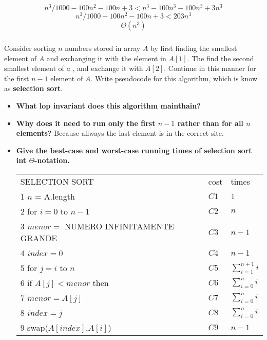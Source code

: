 \documentclass[a4paper,12pt]{article}
\begin{document}
  $$n^3/1000 - 100n^2 - 100n + 3 < n^3 - 100n^3 - 100n^3 + 3n^3$$
  $$n^3/1000 - 100n^2 - 100n + 3 < 203n^3$$
  $$\Theta(n^3)$$
  
    \subsubsection{} Consider sorting $n$ numbers stored in array $A$
    by first finding the smallest element of $A$ and exchanging it with
    the element in $A[1]$. The find the second smallest element of $a$
    , and exchange it with $A[2]$. Continue in this manner for the first $n-1$
    element of $A$. Write pseudocode for this algorithm, which is know as 
    \textbf{selection sort}.
    
    \begin{itemize}
     \item  \textbf {What lop invariant does this algorithm mainthain?}
     
     \item \textbf{ Why does it need to run only the first $n-1$ rather than for all $n$ elements?}  
	  \hspace{2mm} Because allways the last element is in the correct site.
     
     \item \textbf{Give the best-case and worst-case running times of
     selection sort int $\Theta$-notation.}
     
     \begin{tabular}{l l l}
      SELECTION SORT & cost & times \\
      1	$n$ = A.length & $C1$ & $1$ \\
      2 for $i = 0$ to $n-1$ & $C2$ & $n$ \\
      3	\hspace{0.5cm} $menor =$ NUMERO INFINITAMENTE GRANDE & $C3$ & $n-1$ \\
      4 \hspace{0.5cm} $index = 0$ & $C4$ & $n-1$ \\
      5	\hspace{0.5cm} for $j = i$ to $n$ & $C5$ & $\sum_{i=1}^{n+1} i$ \\
      6 \hspace{1cm} if $A[j] <  menor$ then & $C6$ & $\sum_{i=0}^{n} i$ \\
      7 \hspace{1.5cm} $menor = A[j]$ & $C7$ & $\sum_{i=0}^{n} i$ \\
      8 \hspace{1.5cm} $index = j$ & $C8$ & $\sum_{i=0}^{n} i$ \\
      9 \hspace{0.5cm} swap($A[index]$,$A[i]$) & $C9$ & $n-1$	
     \end{tabular}


\end{itemize}
\end{document}
